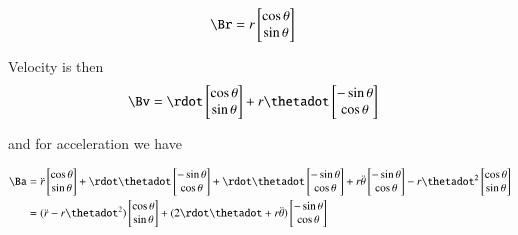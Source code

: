 \documentclass{article}
\begin{document}
\begin{align*}
\Br 
&= r 
\begin{bmatrix}
\cos\theta \\
\sin\theta
\end{bmatrix}
\end{align*}

Velocity is then
\begin{align*}
\Bv 
&= 
\rdot 
\begin{bmatrix}
\cos\theta \\
\sin\theta
\end{bmatrix}
+r \thetadot
\begin{bmatrix}
-\sin\theta \\
\cos\theta
\end{bmatrix}
\end{align*}

and for acceleration we have

\begin{align*}
\Ba 
&= 
\ddot{r}
\begin{bmatrix}
\cos\theta \\
\sin\theta
\end{bmatrix}
+\rdot \thetadot
\begin{bmatrix}
-\sin\theta \\
\cos\theta
\end{bmatrix}
+\rdot \thetadot
\begin{bmatrix}
-\sin\theta \\
\cos\theta
\end{bmatrix}
+r \ddot{\theta}
\begin{bmatrix}
-\sin\theta \\
\cos\theta
\end{bmatrix}
-r \thetadot^2
\begin{bmatrix}
\cos\theta \\
\sin\theta 
\end{bmatrix} \\
&=
(\ddot{r} -r \thetadot^2)
\begin{bmatrix}
\cos\theta \\
\sin\theta
\end{bmatrix}
+(2\rdot \thetadot +r \ddot{\theta})
\begin{bmatrix}
-\sin\theta \\
\cos\theta
\end{bmatrix}
\end{align*}



\end{document}
